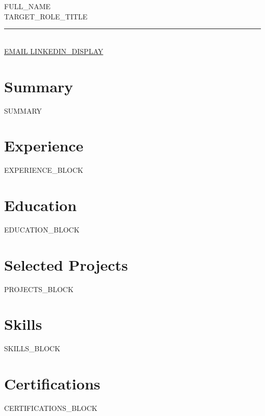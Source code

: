 \documentclass[a4paper,11pt]{article}
\begin{document}
\begin{center}
  {\Huge {{FULL_NAME}} }\\[6pt]
  {\large {{TARGET_ROLE_TITLE}} }\\[10pt]
  \rule{0.5\linewidth}{0.4pt}\\[10pt]
  {\small
    \href{mailto:{{EMAIL}}}{ {{EMAIL}} }  \quad
    \href{ {{LINKEDIN_URL}} }{ {{LINKEDIN_DISPLAY}} }
  }
\end{center}

\vspace{18pt}
\section*{Summary}
{{SUMMARY}}

\vspace{6pt}
\section*{Experience}
{{EXPERIENCE_BLOCK}}

\vspace{6pt}
\section*{Education}
{{EDUCATION_BLOCK}}

\vspace{6pt}
\section*{Selected Projects}
{{PROJECTS_BLOCK}}

\vspace{6pt}
\section*{Skills}
{{SKILLS_BLOCK}}

\vspace{6pt}
\section*{Certifications}
{{CERTIFICATIONS_BLOCK}}
\end{document}
